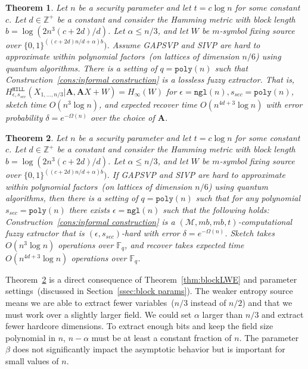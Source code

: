 \documentclass[11pt]{article}
\newcommand{\secref}[1]{\mbox{Section~\ref{#1}}}
\newcommand{\thref}[1]{\mbox{Theorem~\ref{#1}}}
\newcommand{\consref}[1]{\mbox{Construction~\ref{#1}}}
\newcommand{\zo}{\ensuremath{\{0, 1\}}}
\newcommand{\vect}[1]{\ensuremath{\textbf{#1}}}
\newcommand{\Fq}{\ensuremath{\mathbb{F}_q}}
\newcommand{\hill}{\ensuremath{\mathtt{HILL}}\xspace}
\newcommand{\poly}{\ensuremath{\mathtt{poly}}\xspace}
\newcommand{\ngl}{\ensuremath{\mathtt{ngl}}\xspace}
\newcommand{\Hoo}{\mathrm{H}_\infty}
\newtheorem{theorem}{Theorem}[section]
\newcommand{\vA}{\vect{A}}
\newcommand{\M}{\mathcal{M}}
\begin{document}
\begin{theorem}
\label{thm:lossless block sketch log}
Let $n$ be a security parameter and let $t = c\log n$ for some constant $c$.  Let $d\in\mathbb{Z}^+$ be a constant and consider the Hamming metric with block length $b = \log (2n^3 (c+2d)/d)$.  Let $\alpha \leq n/3$, and let $W$ be $m$-symbol fixing source over $\zo^{\left((c+2d)n/d+\alpha \right)b})$.  Assume GAPSVP and SIVP are hard to approximate within polynomial factors~(on lattices of dimension $n/6$) using quantum algorithms.   There is a setting of $q = \poly(n)$ such that \consref{cons:informal construction} is a lossless fuzzy extractor.  That is, $H^{\hill}_{\epsilon, s_{sec}}(X_{1,..., n/3} |\vA, \vA X+W) = H_\infty(W)$ for %
$\epsilon = \ngl(n), s_{sec} = \poly(n)$, sketch time $O(n^3\log n)$, and expected recover time $O(n^{4d+3} \log n)$ with error probability $\delta = e^{-\Omega(n)}$ over the choice of $\vA$.
\end{theorem}

\begin{theorem}
\label{thm:lossless block sketch log}
Let $n$ be a security parameter and let $t = c\log n$ for some constant $c$.  Let $d\in\mathbb{Z}^+$ be a constant and consider the Hamming metric with block length $b = \log (2n^3 (c+2d)/d)$.  Let $\alpha \leq n/3$, and let $W$ be $m$-symbol fixing source over $\zo^{\left((c+2d)n/d+\alpha \right)b})$.  If GAPSVP and SIVP are hard to approximate within polynomial factors~(on lattices of dimension $n/6$) using quantum algorithms, then  there is a setting of $q = \poly(n)$ such that for any polynomial $s_{sec} = \poly(n)$
 there exists $\epsilon = \ngl(n)$ such that the following holds: 
\consref{cons:informal construction} is a $(\M, mb, mb, t)$-computational fuzzy extractor that is $(\epsilon, s_{sec})$-hard with error $\delta = e^{-\Omega(n)}$. Sketch takes $O(n^3\log n)$ operations over $\Fq$, and recover takes expected time $O(n^{4d+3} \log n)$ operations over $\Fq$.
\end{theorem}

\thref{thm:lossless block sketch log} is a direct consequence of \thref{thm:blockLWE} and parameter settings~(discussed in  \secref{ssec:block params}).  The weaker entropy source means we are able to extract fewer variables~($n/3$ instead of $n/2$) and that we must work over a slightly larger field.  We could set $\alpha$ larger than $n/3$ and extract fewer hardcore dimensions.  To extract enough bits and keep the field size polynomial in $n$, $n-\alpha$ must be at least a constant fraction of $n$.  The parameter $\beta$ does not significantly impact the asymptotic behavior but is important for small values of $n$.
\end{document}
